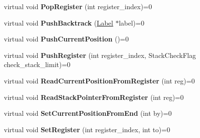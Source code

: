 \begin{DoxyCompactItemize}
\item 
virtual void {\bfseries Pop\+Register} (int register\+\_\+index)=0\hypertarget{classv8_1_1internal_1_1_reg_exp_macro_assembler_accf76e0091230e0e29f58bed22826fcb}{}\label{classv8_1_1internal_1_1_reg_exp_macro_assembler_accf76e0091230e0e29f58bed22826fcb}

\item 
virtual void {\bfseries Push\+Backtrack} (\hyperlink{classv8_1_1internal_1_1_label}{Label} $\ast$label)=0\hypertarget{classv8_1_1internal_1_1_reg_exp_macro_assembler_a3c79da20c15da3339defb598cdaeb45e}{}\label{classv8_1_1internal_1_1_reg_exp_macro_assembler_a3c79da20c15da3339defb598cdaeb45e}

\item 
virtual void {\bfseries Push\+Current\+Position} ()=0\hypertarget{classv8_1_1internal_1_1_reg_exp_macro_assembler_a96c21dc359474e6db50893c0b8fea4fe}{}\label{classv8_1_1internal_1_1_reg_exp_macro_assembler_a96c21dc359474e6db50893c0b8fea4fe}

\item 
virtual void {\bfseries Push\+Register} (int register\+\_\+index, Stack\+Check\+Flag check\+\_\+stack\+\_\+limit)=0\hypertarget{classv8_1_1internal_1_1_reg_exp_macro_assembler_a2d225e3c6813a1f170ae2aeb48898490}{}\label{classv8_1_1internal_1_1_reg_exp_macro_assembler_a2d225e3c6813a1f170ae2aeb48898490}

\item 
virtual void {\bfseries Read\+Current\+Position\+From\+Register} (int reg)=0\hypertarget{classv8_1_1internal_1_1_reg_exp_macro_assembler_a810b1e8b1bf498658765a4d3358b8ead}{}\label{classv8_1_1internal_1_1_reg_exp_macro_assembler_a810b1e8b1bf498658765a4d3358b8ead}

\item 
virtual void {\bfseries Read\+Stack\+Pointer\+From\+Register} (int reg)=0\hypertarget{classv8_1_1internal_1_1_reg_exp_macro_assembler_a9da08910342d85b0ae9b444d9dd9a443}{}\label{classv8_1_1internal_1_1_reg_exp_macro_assembler_a9da08910342d85b0ae9b444d9dd9a443}

\item 
virtual void {\bfseries Set\+Current\+Position\+From\+End} (int by)=0\hypertarget{classv8_1_1internal_1_1_reg_exp_macro_assembler_a7bd6e918db0bc938c5d26728c63b0b46}{}\label{classv8_1_1internal_1_1_reg_exp_macro_assembler_a7bd6e918db0bc938c5d26728c63b0b46}

\item 
virtual void {\bfseries Set\+Register} (int register\+\_\+index, int to)=0\hypertarget{classv8_1_1internal_1_1_reg_exp_macro_assembler_a545e20d50385d80782124f3562907417}{}\label{classv8_1_1internal_1_1_reg_exp_macro_assembler_a545e20d50385d80782124f3562907417}


\end{DoxyCompactItemize}
